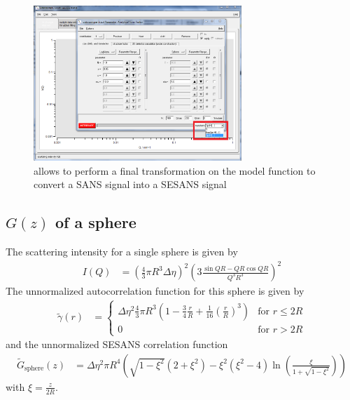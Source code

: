 \begin{figure}[htb]
\begin{center}
\includegraphics[width=0.7\textwidth]{../images/GUI/HankelOperator.png}
\end{center}
\caption{\SASfit allows to perform a final transformation on the model function to convert a SANS signal into a SESANS signal}
\label{fig:HankelOp}
\end{figure}


\subsection{$G(z)$ of a sphere}
\label{sec:Gz_sphere}
The scattering intensity for a single sphere is given by
\begin{align}
I(Q) &= \left(\frac{4}{3}\pi R^3 \Delta\eta\right)^2 \left(3\frac{\sin QR-QR\cos QR}{Q^3R^3}\right)^2
\end{align}
The unnormalized autocorrelation function for this sphere is given by
\begin{align}
\tilde{\gamma}(r) &=
\begin{cases}
 \Delta\eta^2  \frac{4}{3}\pi R^3 \left( 1-\frac{3}{4}\frac{r}{R}+\frac{1}{16}\left(\frac{r}{R}\right)^3\right) & \mbox{for } r\leq 2R \\
0 & \mbox{for }  r>2R
\end{cases}
\end{align}
and the unnormalized SESANS correlation function
\begin{align}
\tilde{G}_\mathrm{sphere}(z)&= \Delta\eta^2 \pi R^4 \left(\sqrt{1-\xi^2}(2+\xi^2)-\xi^2(\xi^2-4)\ln\left(\frac{\xi}{1+\sqrt{1-\xi^2}}\right)\right)
\end{align}
with $\xi=\frac{z}{2R}$.

